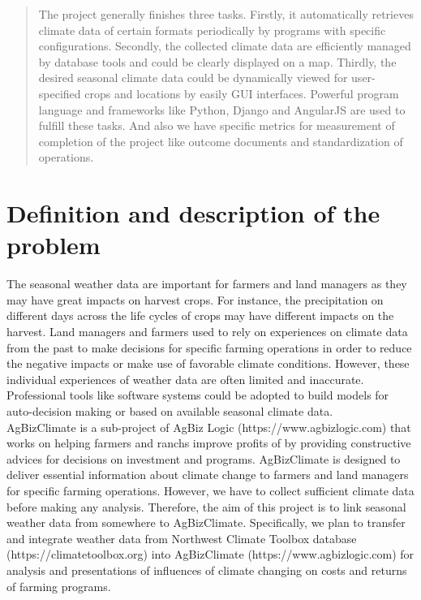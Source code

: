 \documentclass[letterpaper,10pt]{article}
\begin{document}
\begin{titlepage}
\begin{abstract}
    The project generally finishes three tasks. Firstly, it automatically retrieves climate data of certain formats periodically by programs with specific configurations. Secondly, the collected climate data are efficiently managed by database tools and could be clearly displayed on a map. Thirdly, the desired seasonal climate data could be dynamically viewed for user-specified crops and locations by easily GUI interfaces. Powerful program language and frameworks like Python, Django and AngularJS are used to fulfill these tasks. And also we have specific metrics for measurement of completion of the project like outcome documents and standardization of operations.

    \end{abstract}
    \vfill %
    \end{titlepage}

    \section*{Definition and description of the problem}
    The seasonal weather data are important for farmers and land managers as they may have great impacts on harvest crops. For instance, the precipitation on different days across the life cycles of crops may have different impacts on the harvest. Land managers and farmers used to rely on experiences on climate data from the past to make decisions for specific farming operations in order to reduce the negative impacts or make use of favorable climate conditions. However, these individual experiences of weather data are often limited and inaccurate. Professional tools like software systems could be adopted to build models for auto-decision making or based on available seasonal climate data.\\

    AgBizClimate is a sub-project of AgBiz Logic (https://www.agbizlogic.com) that works on helping farmers and ranchs improve profits of by providing constructive advices for decisions on investment and programs. AgBizClimate is designed to deliver essential information about climate change to farmers and land managers for specific farming operations. However, we have to collect sufficient climate data before making any analysis. Therefore, the aim of this project is to link seasonal weather data from somewhere to AgBizClimate. Specifically, we plan to transfer and integrate weather data from Northwest Climate Toolbox database (https://climatetoolbox.org) into AgBizClimate (https://www.agbizlogic.com) for analysis and presentations of influences of climate changing on costs and returns of farming programs.\\
\end{document}
